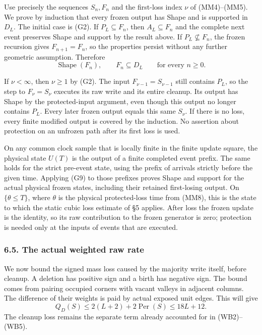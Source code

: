 \documentclass[
  11pt,
  a4paper,
]{article}
\begin{document}
Use precisely the sequences \(S_n,F_n\) and the first-loss index \(\nu\)
of (MM4)--(MM5). We prove by induction that every frozen output has
Shape and is supported in \(D_L\). The initial case is (G2). If
\(P_L\subseteq F_n\), then \(A_L\subseteq F_n\) and the complete next
event preserves Shape and support by the result above. If
\(P_L\not\subseteq F_n\), the frozen recursion gives \(F_{n+1}=F_n\), so
the properties persist without any further geometric assumption.
Therefore \[
\operatorname{Shape}(F_n),\qquad F_n\subseteq D_L
\qquad\text{for every }n\ge0.
\tag{G9}
\]

If \(\nu<\infty\), then \(\nu\ge1\) by (G2). The input
\(F_{\nu-1}=S_{\nu-1}\) still contains \(P_L\), so the step to
\(F_\nu=S_\nu\) executes its raw write and its entire cleanup. Its
output has Shape by the protected-input argument, even though this
output no longer contains \(P_L\). Every later frozen output equals this
same \(S_\nu\). If there is no loss, every finite modified output is
covered by the induction. No assertion about protection on an unfrozen
path after its first loss is used.

On any common clock sample that is locally finite in the finite update
square, the physical state \(U(T)\) is the output of a finite completed
event prefix. The same holds for the strict pre-event state, using the
prefix of arrivals strictly before the given time. Applying (G9) to
those prefixes proves Shape and support for the actual physical frozen
states, including their retained first-losing output. On
\(\{\theta\le T\}\), where \(\theta\) is the physical protected-loss
time from (MM8), this is the state to which the static cubic loss
estimate of §5 applies. After loss the frozen update is the identity, so
its raw contribution to the frozen generator is zero; protection is
needed only at the inputs of events that are executed.

\subsubsection{6.5. The actual weighted raw
rate}\label{the-actual-weighted-raw-rate}

We now bound the signed mass loss caused by the majority write itself,
before cleanup. A deletion has positive sign and a birth has negative
sign. The bound comes from pairing occupied corners with vacant valleys
in adjacent columns. The difference of their weights is paid by actual
exposed unit edges. This will give \[
Q_D(S)\leq 2(L+2)+2\operatorname{Per}(S)\leq18L+12.
\tag{R1}
\] The cleanup loss remains the separate term already accounted for in
(WB2)--(WB5).
\end{document}
